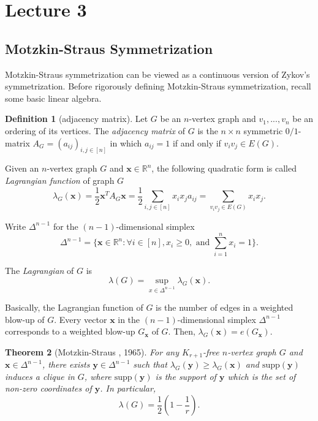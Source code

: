 \documentclass{article}
\newtheorem{theorem}{Theorem}[section]
\theoremstyle{definition}
\newtheorem{definition}[theorem]{Definition}
\newcommand{\supp}{\mathrm{supp}}
\begin{document}
\newpage

\section{Lecture 3}

\subsection{Motzkin-Straus Symmetrization}
Motzkin-Straus symmetrization can be viewed as a continuous version of Zykov's symmetrization. Before rigorously defining Motzkin-Straus symmetrization, recall some basic linear algebra.

\begin{definition}[adjacency matrix]
    Let $G$ be an $n$-vertex graph and $v_1,...,v_n$ be an ordering of its vertices. The \emph{adjacency matrix} of $G$ is the $n \times n$ symmetric $0/1$-matrix $A_G = (a_{ij})_{i,j\in [n]}$ in which $a_{ij} = 1$ if and only if $v_i v_j \in E(G)$.
\end{definition}

Given an $n$-vertex graph $G$ and $\boldsymbol{x} \in \mathbb{R}^n$, the following quadratic form is called \emph{Lagrangian function} of graph $G$
\[
\lambda_G(\boldsymbol{x}) = \frac{1}{2} \boldsymbol{x}^T A_G \boldsymbol{x} = \frac{1}{2} \sum_{i,j \in [n]} x_i x_j a_{ij} = \sum_{v_i v_j \in E(G)} x_i x_j.
\]

Write $\Delta^{n-1}$ for the $(n-1)$-dimensional simplex
\[
\Delta^{n-1} = \{\boldsymbol{x} \in \mathbb{R}^n: \forall i\in [n], x_i \geq 0, \text{ and } \sum_{i=1}^n x_i = 1\}.
\]

The \emph{Lagrangian} of $G$ is
\[
\lambda(G) = \sup_{x \in \Delta^{n-1}} \lambda_G (\boldsymbol{x}).
\]

Basically, the Lagrangian function of $G$ is the number of edges in a weighted blow-up of $G$. Every vector $\boldsymbol{x}$ in the $(n-1)$-dimensional simplex $\Delta^{n-1}$ corresponds to a weighted blow-up $G_{\boldsymbol{x}}$ of $G$. Then, $\lambda_{G}(\boldsymbol{x}) = e(G_{\boldsymbol{x}})$.  

\begin{theorem}[Motzkin-Straus \cite{Motzkin1965sym}, 1965]\label{MSsymmetrization}
    For any $K_{r+1}$-free $n$-vertex graph $G$ and $\boldsymbol{x} \in \Delta^{n-1}$, there exists $\boldsymbol{y} \in \Delta^{n-1}$ such that $\lambda_G(\boldsymbol{y}) \geq \lambda_G(\boldsymbol{x})$ and $\supp(\boldsymbol{y})$ induces a clique in $G$, where $\supp(\boldsymbol{y})$ is the support of $\boldsymbol{y}$ which is the set of non-zero coordinates of $\boldsymbol{y}$. In particular, 
    \[
    \lambda(G) = \frac{1}{2} (1-\frac{1}{r}).
    \]
\end{theorem}
\end{document}
